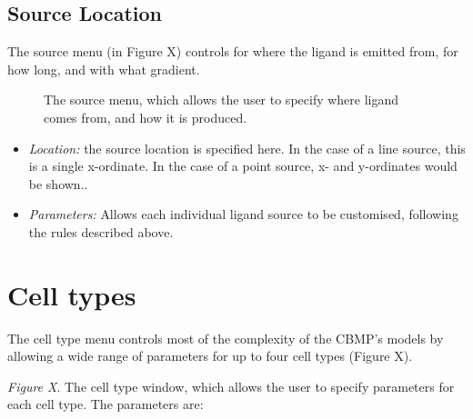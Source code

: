 \documentclass[12pt]{article}
\begin{document}


\subsection{Source Location}
The source menu (in Figure X) controls for where the ligand is emitted 
from, for how long, and with what gradient.

\begin{figure}[H]
\centering
\caption{The source menu, which allows the user to specify 
where ligand comes from, and how it is produced.}
\end{figure}



\begin{itemize}
\item {\itshape Location: }the source location is specified here. In the 
case of a line source, this is a single x-ordinate. In the case of a 
point source, x- and y-ordinates would be shown..
\item {\itshape Parameters: }Allows each individual ligand source to be 
customised, following the rules described above.
\setcounter{numberedCntB}{\theenumi}
\end{itemize}




\section{Cell types}

The cell type menu controls most of the complexity of the CBMP's models 
by allowing a wide range of parameters for up to four cell types (Figure 
X). 

\begin{figure}[H]
\centering
\end{figure}


{\itshape Figure X}. The cell type window, which allows the user to 
specify parameters for each cell type. The parameters are:
\end{document}
